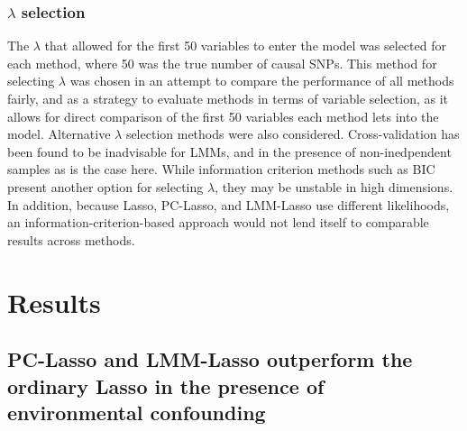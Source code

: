 \subsubsection{$\lambda$ selection}
The $\lambda$ that allowed for the first 50 variables to enter the model was selected for each method, where 50 was the true number of causal SNPs. This method for selecting $\lambda$ was chosen in an attempt to compare the performance of all methods fairly, and as a strategy to evaluate methods in terms of variable selection, as it allows for direct comparison of the first 50 variables each method lets into the model. Alternative $\lambda$ selection methods were also considered. Cross-validation has been found to be inadvisable for LMMs, and in the presence of non-inedpendent samples as is the case here. While information criterion methods such as BIC present another option for selecting $\lambda$, they may be unstable in high dimensions. In addition, because Lasso, PC-Lasso, and LMM-Lasso use different likelihoods, an information-criterion-based approach would not lend itself to comparable results across methods. 


\section{Results} \label{sec:results}

\subsection{PC-Lasso and LMM-Lasso outperform the ordinary Lasso in the presence of environmental confounding}

